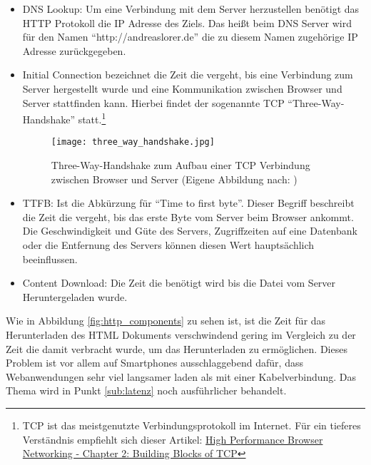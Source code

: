 			\begin{itemize}
				\item DNS Lookup: Um eine Verbindung mit dem Server herzustellen benötigt das HTTP Protokoll die IP Adresse des Ziels. Das heißt beim DNS Server wird für den Namen "`http://andreaslorer.de"' die zu diesem Namen zugehörige IP Adresse zurückgegeben.

				\item Initial Connection bezeichnet die Zeit die vergeht, bis eine Verbindung zum Server hergestellt wurde und eine Kommunikation zwischen Browser und Server stattfinden kann. Hierbei findet der sogenannte TCP "`Three-Way-Handshake"' statt.\footnote{TCP ist das meistgenutzte Verbindungsprotokoll im Internet. Für ein tieferes Verständnis empfiehlt sich dieser Artikel: \href{http://chimera.labs.oreilly.com/books/1230000000545/ch02.html}{High Performance Browser Networking - Chapter 2: Building Blocks of TCP}}

				\begin{figure}[htbp]
					\begin{center}
						\texttt{[image: three\_way\_handshake.jpg]}
						\caption{Three-Way-Handshake zum Aufbau einer TCP Verbindung zwischen Browser und Server (Eigene Abbildung nach: \autocite{bos})}
						\label{fig:three_way_handshake}
					\end{center}
				\end{figure}

				\item TTFB: Ist die Abkürzung für "`Time to first byte"'. Dieser Begriff beschreibt die Zeit die vergeht, bis das erste Byte vom Server beim Browser ankommt. Die Geschwindigkeit und Güte des Servers, Zugriffzeiten auf eine Datenbank oder die Entfernung des Servers können diesen Wert hauptsächlich beeinflussen.

				\item Content Download: Die Zeit die benötigt wird bis die Datei vom Server Heruntergeladen wurde.
			\end{itemize}

			Wie in Abbildung \ref{fig:http_components} zu sehen ist, ist die Zeit für das Herunterladen des HTML Dokuments verschwindend gering im Vergleich zu der Zeit die damit verbracht wurde, um das Herunterladen zu ermöglichen. Dieses Problem ist vor allem auf Smartphones ausschlaggebend dafür, dass Webanwendungen sehr viel langsamer laden als mit einer Kabelverbindung. Das Thema wird in Punkt \ref{sub:latenz} noch ausführlicher behandelt.
					
